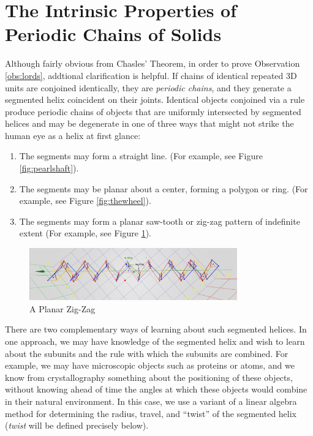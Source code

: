 \documentclass[11pt]{article}
\begin{document}
{\section{The Intrinsic Properties of Periodic Chains of Solids}

Although fairly obvious from Chasles' Theorem, in order to prove Observation \ref{obs:lords},
addtional clarification is helpful.
If chains of identical repeated 3D units are conjoined identically, they are {\em periodic chains},
and they generate a segmented helix coincident on their joints.
Identical objects conjoined via a rule
produce periodic chains of objects that are uniformly intersected
by segmented helices and may be degenerate in one of
three ways that might not strike the human eye as a helix at first glance:
\begin{enumerate}
\item The segments may form a straight line. (For example, see Figure \ref{fig:pearlshaft}).
\item The segments may be planar about a center, forming a polygon or ring. (For example, see Figure \ref{fig:thewheel}).
\item The segments may form a planar saw-tooth or zig-zag pattern of indefinite extent (For example, see Figure \ref{fig:planarzigzag}).
\end{enumerate}

\begin{figure}
     \centering
     \includegraphics[width=0.80\textwidth]{figures/PlanarZigZag.png}
     \caption{A Planar Zig-Zag}
  \label{fig:planarzigzag}
\end{figure}

There are two complementary ways of learning about such segmented helices.
In one approach, we may have knowledge of the segmented helix and
wish to learn about the subunits and the rule with which the subunits are combined.
For example, we may have microscopic objects such as proteins
or atoms, and we know from crystallography something about the positioning of these objects, without
knowing ahead of time the angles at which these objects would combine in their natural environment.
In this case, we use a variant of a linear algebra method\cite{kahn1989defining}
for determining the radius, travel, and ``twist''
of the segmented helix ({\em twist} will be defined precisely below).

}
\end{document}

